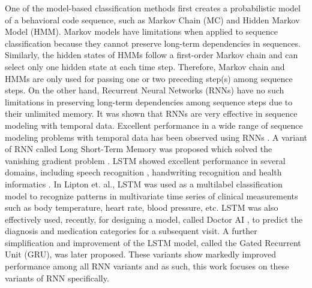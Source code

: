 \documentclass{amia_summit_2018}
\begin{document}

One of the model-based classification methods first creates a probabilistic model of a behavioral code sequence, such as Markov Chain (MC) and Hidden Markov Model \cite{rabiner1989tutorial} (HMM). Markov models have limitations when applied to sequence classification because they cannot preserve long-term dependencies in sequences. Similarly, the hidden states of HMMs follow a first-order Markov chain and can select only one hidden state at each time step. Therefore, Markov chain and HMMs are only used for passing one or two preceding step(s) among sequence steps\cite{kundu1988recognition}. On the other hand, Recurrent Neural Networks (RNNs) have no such limitations in preserving long-term dependencies among sequence steps due to their unlimited memory. It was shown that RNNs are very effective in sequence modeling with temporal data. Excellent performance in a wide range of sequence modeling problems with temporal data has been observed using RNNs \cite{nion2013handwritten, lipton2015learning, choi2016doctor}. A variant of RNN called Long Short-Term Memory was proposed \cite{graves2013speech} which solved the vanishing gradient problem \cite{bengio1993problem}. LSTM showed excellent performance in several domains, including speech recognition \cite{graves2013speech}, handwriting recognition \cite{nion2013handwritten} and health informatics \cite{lipton2015learning, choi2016doctor}. In Lipton et. al.\cite{lipton2015learning}, LSTM was used as a multilabel classification model to recognize patterns in multivariate time series of clinical measurements such as body temperature, heart rate, blood pressure, etc. LSTM was also effectively used, recently, for designing a model, called Doctor AI \cite{choi2016doctor}, to predict the diagnosis and medication categories for a subsequent visit. A further simplification and improvement of the LSTM model, called the Gated Recurrent Unit\cite{chung2014empirical} (GRU), was later proposed. These variants show markedly improved performance among all RNN variants and as such, this work focuses on these variants of RNN specifically.       
\end{document}
